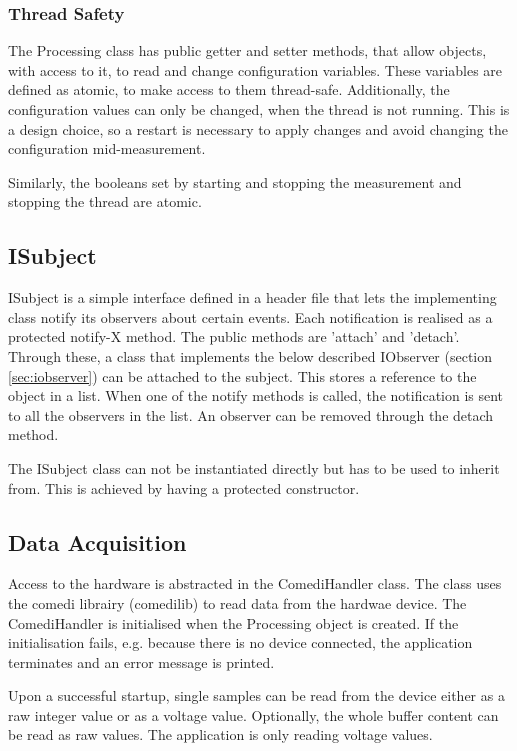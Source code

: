 \subsubsection{Thread Safety}
The Processing class has public getter and setter methods, that allow objects, with access to it, to read and change configuration variables. These variables are defined as atomic, to make access to them thread-safe. Additionally, the configuration values can only be changed, when the thread is not running. This is a design choice, so a restart is necessary to apply changes and avoid changing the configuration mid-measurement. 

Similarly, the booleans set by starting and stopping the measurement and stopping the thread are atomic.

\subsection{ISubject}
ISubject is a simple interface defined in a header file that lets the implementing class notify its observers about certain events. Each notification is realised as a protected notify-X method. The public methods are 'attach' and 'detach'. Through these, a class that implements the below described IObserver (section \ref{sec:iobserver}) can be attached to the subject. This stores a reference to the object in a list. When one of the notify methods is called, the notification is sent to all the observers in the list. An observer can be removed through the detach method. 

The ISubject class can not be instantiated directly but has to be used to inherit from. This is achieved by having a protected constructor.


\subsection{Data Acquisition}
Access to the hardware is abstracted in the ComediHandler class. The class uses the comedi librairy (comedilib) \citep{comedi} to read data from the hardwae device. The ComediHandler is initialised when the Processing object is created. If the initialisation fails, e.g. because there is no device connected, the application terminates and an error message is printed.

Upon a successful startup, single samples can be read from the device either as a raw integer value or as a voltage value. Optionally, the whole buffer content can be read as raw values. The application is only reading voltage values.


